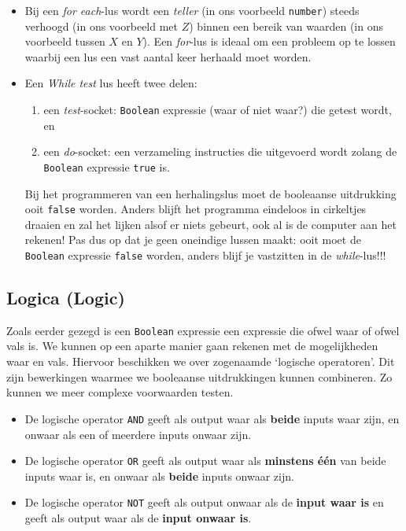 
\begin{itemize}
	\item Bij een \emph{for each}-lus wordt een \emph{teller} (in ons voorbeeld \texttt{number}) steeds verhoogd (in ons voorbeeld met $Z$) binnen een bereik van waarden (in ons voorbeeld tussen $X$ en $Y$). Een \emph{for}-lus is ideaal om een probleem op te lossen waarbij een lus een vast aantal keer herhaald moet worden.

	\item Een \emph{While test} lus heeft twee delen: 
	\begin{enumerate}
		\item een \emph{test}-socket: \texttt{Boolean} expressie (waar of niet waar?) die getest wordt, en 
		\item een \emph{do}-socket: een verzameling instructies die uitgevoerd wordt zolang de \texttt{Boolean} expressie \texttt{true} is.
	\end{enumerate}
	Bij het programmeren van een herhalingslus moet de booleaanse uitdrukking ooit \texttt{false} worden. Anders blijft het programma eindeloos in cirkeltjes draaien en zal het lijken alsof er niets gebeurt, ook al is de computer aan het rekenen!
	Pas dus op dat je geen oneindige lussen maakt: ooit moet de \texttt{Boolean} expressie \texttt{false} worden, anders blijf je vastzitten in de \emph{while}-lus!!!
\end{itemize}

\subsection{Logica (Logic)}

Zoals eerder gezegd is een \texttt{Boolean} expressie een expressie die ofwel waar of ofwel vals is.
We kunnen op een aparte manier gaan rekenen met de mogelijkheden waar en vals.
Hiervoor beschikken we over zogenaamde \textquoteleft logische operatoren\textquoteright. 
Dit zijn bewerkingen waarmee we booleaanse uitdrukkingen kunnen combineren.
Zo kunnen we meer complexe voorwaarden testen. 

\begin{itemize}
	\item De logische operator \texttt{AND} geeft als output waar als \textbf{beide} inputs waar zijn, en onwaar als een of meerdere inputs onwaar zijn. 

	\item De logische operator \texttt{OR} geeft als output waar als \textbf{minstens \'e\'en} van beide inputs waar is, en onwaar als \textbf{beide} inputs onwaar zijn.
	
	\item De logische operator \texttt{NOT} geeft als output onwaar als de \textbf{input waar is} en geeft als output waar als de \textbf{input onwaar is}.
\end{itemize}

